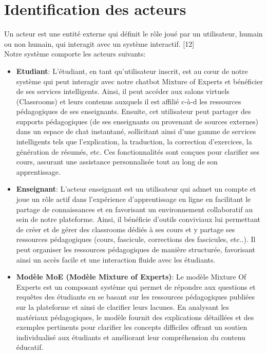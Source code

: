 \section{Identification des acteurs}
\justifying
Un acteur est une entité externe qui définit le rôle joué par un utilisateur, humain ou non humain, qui interagit avec un système interactif. [12]\\
Notre système comporte les acteurs suivants:
\begin{itemize}[itemsep=2pt, parsep=2pt]
    \item \textbf{Etudiant}: L'étudiant, en tant qu'utilisateur inscrit, est au cœur de notre système qui peut interagir avec notre chatbot Mixture of Experts et bénéficier de ses services intelligents. Ainsi, il peut accéder aux salons virtuels (Classrooms) et leurs contenus auxquels il est affilié  c-à-d les ressources pédagogiques de ses enseignants. Ensuite, cet utilisateur peut partager des supports pédagogiques (de ses enseignants ou provenant de sources externes) dans un espace de chat instantané, sollicitant ainsi d'une gamme de services intelligents tels que l'explication, la traduction, la correction d'exercices, la génération de résumés, etc. Ces fonctionnalités sont conçues pour clarifier ses cours, assurant une assistance personnalisée tout au long de son apprentissage.
    \item \textbf{Enseignant}:  L'acteur enseignant est un utilisateur qui admet un compte et joue un rôle actif dans l'expérience d'apprentissage en ligne en facilitant le partage de connaissances et en favorisant un environnement collaboratif au sein de notre plateforme. Ainsi, il bénéficie d'outils conviviaux lui permettant de créer et de gérer des classrooms dédiés à ses cours et y partage ses ressources pédagogiques (cours, fascicule, corrections des fascicules, etc..). Il peut organiser les ressources pédagogiques de manière structurée, favorisant ainsi un accès facile et une interaction fluide avec les étudiants.
    \item \textbf{Modèle MoE (Modèle Mixture of Experts)}:  Le modèle Mixture Of Experts est un composant système qui permet de répondre aux questions et requêtes des étudiants en se basant sur les ressources pédagogiques publiées sur la plateforme et ainsi de clarifier leurs lacunes. En analysant les matériaux pédagogiques, le modèle fournit des explications détaillées et des exemples pertinents pour clarifier les concepts difficiles offrant un soutien individualisé aux étudiants et améliorant leur compréhension du contenu éducatif.
\end{itemize}

